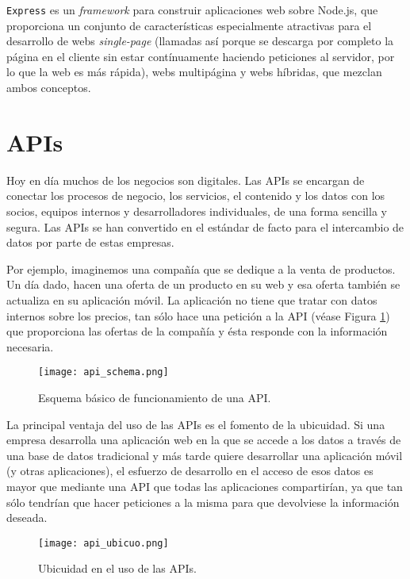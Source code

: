 \texttt{Express} es un \textit{framework} \cite{37} para construir aplicaciones web sobre Node.js, que proporciona un conjunto de características especialmente atractivas para el desarrollo de webs \textit{single-page} (llamadas así porque se descarga por completo la página en el cliente sin estar contínuamente haciendo peticiones al servidor, por lo que la web es más rápida), webs multipágina y webs híbridas, que mezclan ambos conceptos. 

\section{\acf{API}s}

Hoy en día muchos de los negocios son digitales. Las \ac{API}s \cite{38} se encargan de conectar los procesos de negocio, los servicios, el contenido y los datos con los socios, equipos internos y desarrolladores individuales, de una forma sencilla y segura. Las \ac{API}s se han convertido en el estándar de facto para el intercambio de datos por parte de estas empresas.

Por ejemplo, imaginemos una compañía que se dedique a la venta de productos. Un día dado, hacen una oferta de un producto en su web y esa oferta también se actualiza en su aplicación móvil. La aplicación no tiene que tratar con datos internos sobre los precios, tan sólo hace una petición a la \ac{API} (véase Figura \ref{fig:apischema}) que proporciona las ofertas de la compañía y ésta responde con la información necesaria.

\begin{figure}[!h]
\begin{center}
\texttt{[image: api\_schema.png]}
\caption{Esquema básico de funcionamiento de una \ac{API}.}
\label{fig:apischema}
\end{center}
\end{figure}

La principal ventaja del uso de las \ac{API}s es el fomento de la ubicuidad. Si una empresa desarrolla una aplicación web en la que se accede a los datos a través de una base de datos tradicional y más tarde quiere desarrollar una aplicación móvil (y otras aplicaciones), el esfuerzo de desarrollo en el acceso de esos datos es mayor que mediante una \ac{API} que todas las aplicaciones compartirían, ya que tan sólo tendrían que hacer peticiones a la misma para que devolviese la información deseada.

\begin{figure}[!h]
\begin{center}
\texttt{[image: api\_ubicuo.png]}
\caption{Ubicuidad en el uso de las \ac{API}s.}
\label{fig:apiubicuo}
\end{center}
\end{figure}

